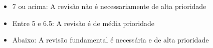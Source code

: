 \documentclass[12pt, addpoints]{exam}
\begin{document}
\begin{questions}


\end{questions}

\begin{center}
\gradetable[h][questions]
\end{center}

\begin{itemize}
  \item 7 ou acima: A revisão não é necessariamente de alta prioridade
  \item Entre 5 e 6.5: A revisão é de média prioridade
  \item Abaixo: A revisão fundamental é necessária e de alta prioridade
\end{itemize}
\end{document}
